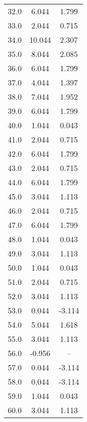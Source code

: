 \begin{longtable}{ccc}
32.0 & 6.044 & 1.799 \\
33.0 & 2.044 & 0.715 \\
34.0 & 10.044 & 2.307 \\
35.0 & 8.044 & 2.085 \\
36.0 & 6.044 & 1.799 \\
37.0 & 4.044 & 1.397 \\
38.0 & 7.044 & 1.952 \\
39.0 & 6.044 & 1.799 \\
40.0 & 1.044 & 0.043 \\
41.0 & 2.044 & 0.715 \\
42.0 & 6.044 & 1.799 \\
43.0 & 2.044 & 0.715 \\
44.0 & 6.044 & 1.799 \\
45.0 & 3.044 & 1.113 \\
46.0 & 2.044 & 0.715 \\
47.0 & 6.044 & 1.799 \\
48.0 & 1.044 & 0.043 \\
49.0 & 3.044 & 1.113 \\
50.0 & 1.044 & 0.043 \\
51.0 & 2.044 & 0.715 \\
52.0 & 3.044 & 1.113 \\
53.0 & 0.044 & -3.114 \\
54.0 & 5.044 & 1.618 \\
55.0 & 3.044 & 1.113 \\
56.0 & -0.956 & -- \\
57.0 & 0.044 & -3.114 \\
58.0 & 0.044 & -3.114 \\
59.0 & 1.044 & 0.043 \\
60.0 & 3.044 & 1.113 \\
\hline
\end{longtable}
